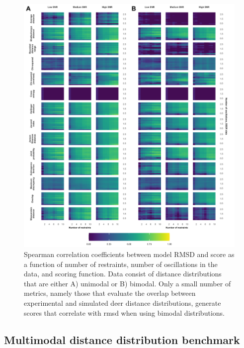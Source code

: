 \begin{figure}[h!]
\centering
\includegraphics[width=6in]{Figures/scoring_heatmap.pdf}
 \caption[Spearman correlation coefficients between model RMSD and score as a function of number of restraints, number of oscillations in the data, and scoring function.]{Spearman correlation coefficients between model RMSD and score as a function of number of restraints, number of oscillations in the data, and scoring function. Data consist of distance distributions that are either A) unimodal or B) bimodal. Only a small number of metrics, namely those that evaluate the overlap between experimental and simulated \gls{deer} distance distributions, generate scores that correlate with \gls{rmsd} when using bimodal distributions.}
\label{fig:scoring_heatmap}
\end{figure}

\subsection{Multimodal distance distribution benchmark}

